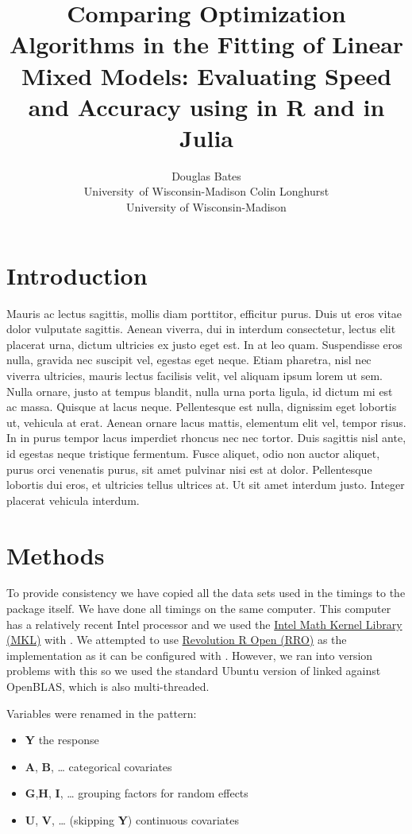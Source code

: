 \documentclass[article]{jss}
\author{Douglas Bates\\University\ of Wisconsin-Madison \And 
        Colin Longhurst \\University of Wisconsin-Madison}
\title{Comparing Optimization Algorithms in the Fitting of Linear Mixed Models: Evaluating Speed and Accuracy using \pkg{lme4} in R and \pkg{lmm} in Julia}
\begin{document}

\section[Introduction]{Introduction}

Mauris ac lectus sagittis, mollis diam porttitor, efficitur purus. Duis ut eros vitae dolor vulputate sagittis. Aenean viverra, dui in interdum consectetur, lectus elit placerat urna, dictum ultricies ex justo eget est. In at leo quam. Suspendisse eros nulla, gravida nec suscipit vel, egestas eget neque. Etiam pharetra, nisl nec viverra ultricies, mauris lectus facilisis velit, vel aliquam ipsum lorem ut sem. Nulla ornare, justo at tempus blandit, nulla urna porta ligula, id dictum mi est ac massa. Quisque at lacus neque. Pellentesque est nulla, dignissim eget lobortis ut, vehicula at erat. Aenean ornare lacus mattis, elementum elit vel, tempor risus. In in purus tempor lacus imperdiet rhoncus nec nec tortor. Duis sagittis nisl ante, id egestas neque tristique fermentum. Fusce aliquet, odio non auctor aliquet, purus orci venenatis purus, sit amet pulvinar nisi est at dolor. Pellentesque lobortis dui eros, et ultricies tellus ultrices at. Ut sit amet interdum justo. Integer placerat vehicula interdum. 

\section[Methods]{Methods}


To provide consistency we have copied all the data sets used in the
timings to the  package itself. We have done all timings
on the same computer. This computer has a relatively recent Intel
processor and we used the
\href{https://software.intel.com/en-us/intel-mkl}{Intel Math Kernel
Library (MKL)} with . We attempted to use
\href{www.revolutionanalytics.com/revolution-r-open}{Revolution R Open
(RRO)} as the  implementation as it can be configured with .
However, we ran into version problems with this so we used the standard
Ubuntu version of  linked against OpenBLAS, which is also
multi-threaded.

Variables were renamed in the pattern: 

\begin{itemize}
\item \textbf{Y} the response 
\item \textbf{A}, \textbf{B}, \dots{} categorical covariates 
\item \textbf{G},\textbf{H}, \textbf{I}, \dots{} grouping factors for random effects 
\item \textbf{U}, \textbf{V}, \dots{} (skipping \textbf{Y}) continuous covariates
\end{itemize}
\end{document}
